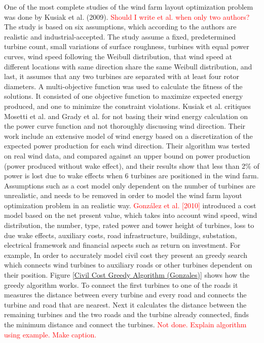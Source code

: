 \noindent One of the most complete studies of the wind farm layout optimization problem was done by Kusiak et al. (2009). \textcolor{red}{Should I write et al. when only two authors?} The study is based on six assumptions, which according to the authors are realistic and industrial-accepted. The study assume a fixed, predetermined turbine count, small variations of surface roughness, turbines with equal power curves, wind speed following the Weibull distribution, that wind speed at different locations with same direction share the same Weibull distribution, and last, it assumes that any two turbines are separated with at least four rotor diameters. A multi-objective function was used to calculate the fitness of the solutions. It consisted of one objective function to maximize expected energy produced, and one to minimize the constraint violations. Kusiak et al. critiques Mosetti et al. and Grady et al. for not basing their wind energy calculation on the power curve function and not thoroughly discussing wind direction. Their work include an extensive model of wind energy based on a discretization of the expected power production for each wind direction. Their algorithm was tested on real wind data, and compared against an upper bound on power production (power produced without wake effect), and their results show that less than 2\% of power is lost due to wake effects when 6 turbines are positioned in the wind farm. \\


\noindent Assumptions such as a cost model only dependent on the number of turbines are unrealistic, and needs to be removed in order to model the wind farm layout optimization problem in an realistic way. \textcolor{red}{González et al. [2010]} introduced a cost model based on the net present value, which takes into account wind speed, wind distribution, the number, type, rated power and tower height of turbines, loss to due wake effects, auxiliary costs, road infrastructure, buildings, substation, electrical framework and financial aspects such as return on investment. For example, In order to accurately model civil cost they present an greedy search which connects wind turbines to auxiliary roads or other turbines dependent on their position. Figure \ref{Civil Cost Greedy Algorithm (Gonzales)} shows how the greedy algorithm works. To connect the first turbines to one of the roads it measures the distance between every turbine and every road and connects the turbine and road that are nearest. Next it calculates the distance between the remaining turbines and the two roads and the turbine already connected, finds the minimum distance and connect the turbines. \textcolor{red}{Not done. Explain algorithm using example. Make caption.}


